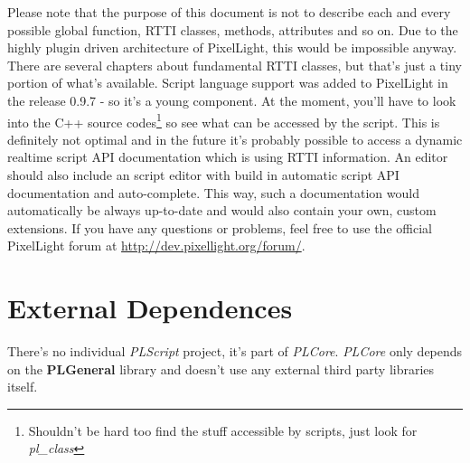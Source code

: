 Please note that the purpose of this document is not to describe each and every possible global function, RTTI classes, methods, attributes and so on. Due to the highly plugin driven architecture of PixelLight, this would be impossible anyway. There are several chapters about fundamental RTTI classes, but that's just a tiny portion of what's available. Script language support was added to PixelLight in the release 0.9.7 - so it's a young component. At the moment, you'll have to look into the C++ source codes\footnote{Shouldn't be hard too find the stuff accessible by scripts, just look for \emph{pl\_class}} so see what can be accessed by the script. This is definitely not optimal and in the future it's probably possible to access a dynamic realtime script API documentation which is using RTTI information. An editor should also include an script editor with build in automatic script API documentation and auto-complete. This way, such a documentation would automatically be always up-to-date and would also contain your own, custom extensions. If you have any questions or problems, feel free to use the official PixelLight forum at \url{http://dev.pixellight.org/forum/}.




\section{External Dependences}
There's no individual \emph{PLScript} project, it's part of \emph{PLCore}. \emph{PLCore} only depends on the \textbf{PLGeneral} library and doesn't use any external third party libraries itself.
